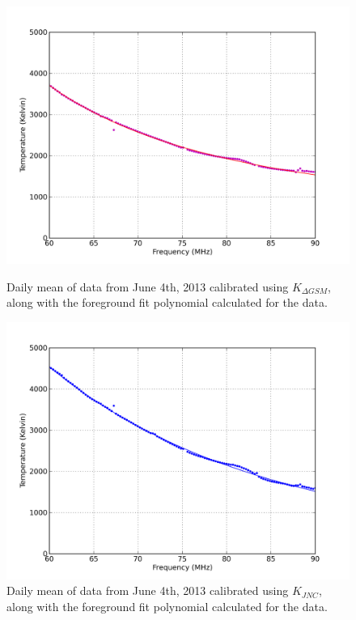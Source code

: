 \begin{figure}[htb]
\centering
\begin{minipage}[b]{0.48\textwidth}
\centering
\includegraphics[width=0.95\linewidth]{Data_analysis/figures/June_04_Kdgsm_mean_fit.png}
\caption{Daily mean of data from June 4th, 2013 calibrated using $K_{\Delta GSM}$, along with the foreground fit polynomial calculated for the data. }
\label{Fig:Kdgsm_mean}
\end{minipage}%
\begin{minipage}[b]{0.02\textwidth}
\hspace{1cm}
\end{minipage}%
\begin{minipage}[b]{0.48\textwidth}
\centering
\includegraphics[width=0.95\linewidth]{Data_analysis/figures/June_04_Kt_mean_fit.png}
\caption{Daily mean of data from June 4th, 2013 calibrated using $K_{JNC}$, along with the foreground fit polynomial calculated for the data. }
\label{Fig:Kjnc_mean}
\end{minipage}
\end{figure}



